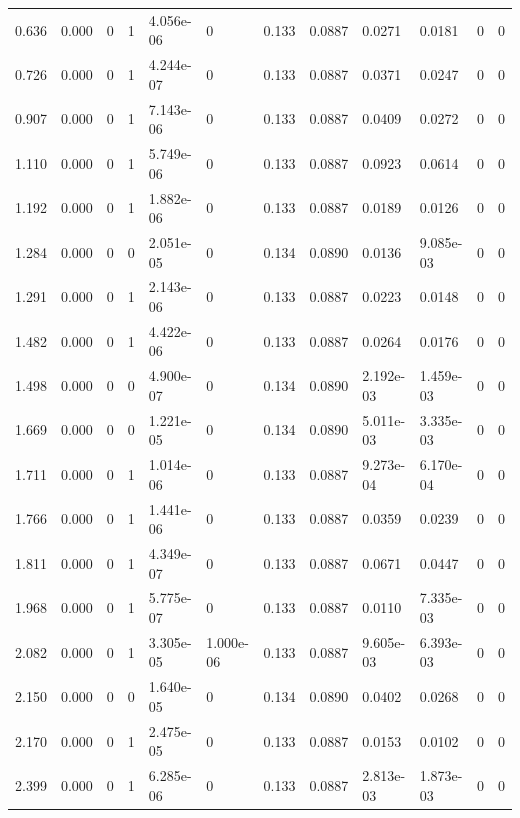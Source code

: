 \documentclass[preview]{standalone}
\begin{document}
{{\begin{tabular}{L{1.2cm}C{1.2cm} C{0.3cm}C{0.5cm} C{1.4cm}C{1.4cm} C{1.4cm}C{1.4cm} C{1.6cm}C{1.6cm} C{1.6cm}C{1.6cm}}
  0.636  &  0.000  & 0     &  1 &  4.056e-06  & 0  &  0.133&   0.0887& 0.0271 & 0.0181   &  0 & 0  \\ 
  0.726  &  0.000  & 0     &  1 &  4.244e-07  & 0  &  0.133&   0.0887& 0.0371 & 0.0247   &  0 & 0  \\ 
  0.907  &  0.000  & 0     &  1 &  7.143e-06  & 0  &  0.133&   0.0887& 0.0409 & 0.0272   &  0 & 0  \\ 
  1.110  &  0.000  & 0     &  1 &  5.749e-06  & 0  &  0.133&   0.0887& 0.0923 & 0.0614   &  0 & 0  \\ 
  1.192  &  0.000  & 0     &  1 &  1.882e-06  & 0  &  0.133&   0.0887& 0.0189 & 0.0126   &  0 & 0  \\ 
  1.284  &  0.000  & 0     &  0 &  2.051e-05  & 0  &  0.134&   0.0890& 0.0136 & 9.085e-03   &  0 & 0  \\ 
  1.291  &  0.000  & 0     &  1 &  2.143e-06  & 0  &  0.133&   0.0887& 0.0223 & 0.0148   &  0 & 0  \\ 
  1.482  &  0.000  & 0     &  1 &  4.422e-06  & 0  &  0.133&   0.0887& 0.0264 & 0.0176   &  0 & 0  \\ 
  1.498  &  0.000  & 0     &  0 &  4.900e-07  & 0  &  0.134&   0.0890& 2.192e-03 & 1.459e-03   &  0 & 0  \\ 
  1.669  &  0.000  & 0     &  0 &  1.221e-05  & 0  &  0.134&   0.0890& 5.011e-03 & 3.335e-03   &  0 & 0  \\ 
  1.711  &  0.000  & 0     &  1 &  1.014e-06  & 0  &  0.133&   0.0887& 9.273e-04 & 6.170e-04   &  0 & 0  \\ 
  1.766  &  0.000  & 0     &  1 &  1.441e-06  & 0  &  0.133&   0.0887& 0.0359 & 0.0239   &  0 & 0  \\ 
  1.811  &  0.000  & 0     &  1 &  4.349e-07  & 0  &  0.133&   0.0887& 0.0671 & 0.0447   &  0 & 0  \\ 
  1.968  &  0.000  & 0     &  1 &  5.775e-07  & 0  &  0.133&   0.0887& 0.0110 & 7.335e-03   &  0 & 0  \\ 
  2.082  &  0.000  & 0     &  1 &  3.305e-05  & 1.000e-06  &  0.133&   0.0887& 9.605e-03 & 6.393e-03   &  0 & 0  \\ 
  2.150  &  0.000  & 0     &  0 &  1.640e-05  & 0  &  0.134&   0.0890& 0.0402 & 0.0268   &  0 & 0  \\ 
  2.170  &  0.000  & 0     &  1 &  2.475e-05  & 0  &  0.133&   0.0887& 0.0153 & 0.0102   &  0 & 0  \\ 
  2.399  &  0.000  & 0     &  1 &  6.285e-06  & 0  &  0.133&   0.0887& 2.813e-03 & 1.873e-03   &  0 & 0  \\ 

\end{tabular}}}
\end{document}
